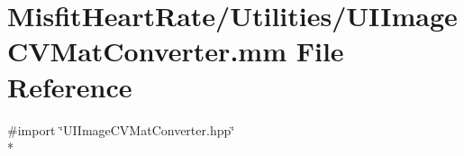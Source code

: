 \hypertarget{_u_i_image_c_v_mat_converter_8mm}{\section{Misfit\+Heart\+Rate/\+Utilities/\+U\+I\+Image\+C\+V\+Mat\+Converter.mm File Reference}
\label{_u_i_image_c_v_mat_converter_8mm}
}
{\ttfamily \#import \char`\"{}U\+I\+Image\+C\+V\+Mat\+Converter.\+hpp\char`\"{}}\\*
